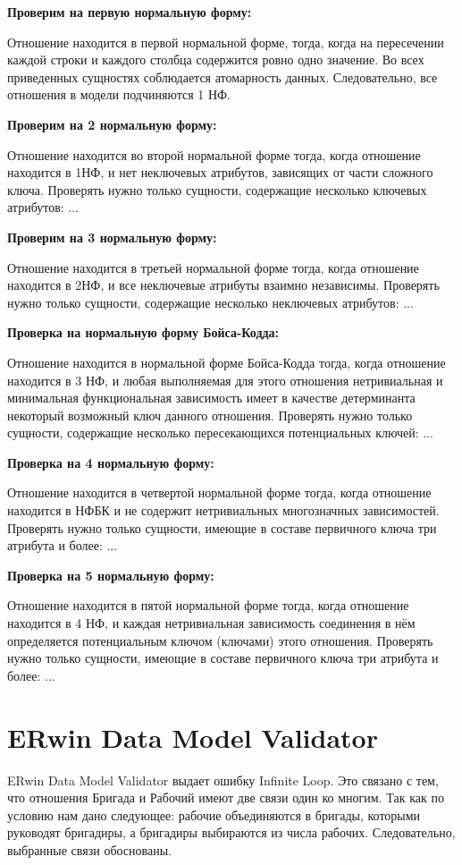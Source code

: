 {\bf Проверим на первую нормальную форму:}

Отношение находится в первой нормальной форме, тогда, когда на пересечении каждой строки и каждого столбца содержится ровно одно значение.
Во всех приведенных сущностях соблюдается атомарность данных.
Следовательно, все отношения в модели подчиняются 1 НФ.

{\bf Проверим на 2 нормальную форму:}

Отношение находится во второй нормальной форме тогда, когда отношение находится в 1НФ, и нет неключевых атрибутов, зависящих от части сложного ключа.
Проверять нужно только сущности, содержащие несколько ключевых атрибутов: ...

{\bf Проверим на 3 нормальную форму:}

Отношение находится в третьей нормальной форме тогда, когда отношение находится в 2НФ, и все неключевые атрибуты взаимно независимы.
Проверять нужно только сущности, содержащие несколько неключевых атрибутов: ...

{\bf Проверка на нормальную форму Бойса-Кодда:}

Отношение находится в нормальной форме Бойса-Кодда тогда, когда отношение находится в 3 НФ, и любая выполняемая для этого отношения нетривиальная и минимальная функциональная зависимость имеет в качестве детерминанта некоторый возможный ключ данного отношения.
Проверять нужно только сущности, содержащие несколько пересекающихся потенциальных ключей: ...

{\bf Проверка на 4 нормальную форму:}

Отношение находится в четвертой нормальной форме тогда, когда отношение находится в НФБК и не содержит нетривиальных многозначных зависимостей.
Проверять нужно только сущности, имеющие в составе первичного ключа три атрибута и более: ...

{\bf Проверка на 5 нормальную форму:}

Отношение находится в пятой нормальной форме тогда, когда отношение находится в 4 НФ, и каждая нетривиальная зависимость соединения в нём определяется потенциальным ключом (ключами) этого отношения.
Проверять нужно только сущности, имеющие в составе первичного ключа три атрибута и более: ...

\section {ERwin Data Model Validator}

ERwin Data Model Validator выдает ошибку Infinite Loop.
Это связано с тем, что отношения Бригада и Рабочий имеют две связи один ко многим.
Так как по условию нам дано следующее: рабочие объединяются в бригады, которыми руководят бригадиры, а бригадиры выбираются из числа рабочих.
Следовательно, выбранные связи обоснованы.

